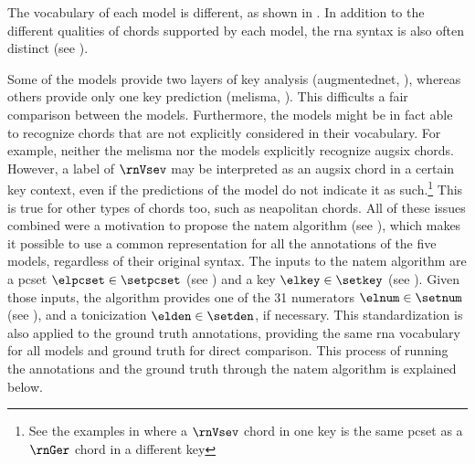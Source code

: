 
The vocabulary of each model is different, as shown in
. In addition to the different
qualities of chords supported by each model, the \gls{rna}
syntax is also often distinct (see
). 


Some of the models provide two layers of key analysis
(\gls{augmentednet}, \cite{micchi2021deep, chen2021attend}),
whereas others provide only one key prediction
(\gls{melisma}, \cite{mcleod2021modular}). This difficults a
fair comparison between the models. Furthermore, the models
might be in fact able to recognize chords that are not
explicitly considered in their vocabulary. For example,
neither the \gls{melisma} nor the
\textcite{mcleod2021modular} models explicitly recognize
\gls{augsix} chords. However, a label of $\rnVsev$ may be
interpreted as an \gls{augsix} chord in a certain key
context, even if the predictions of the model do not
indicate it as such.\footnote{See the examples in
 where a
$\rnVsev$ chord in one key is the same \gls{pcset} as a
$\rnGer$ chord in a different key} This is true for other
types of chords too, such as \gls{neapolitan} chords. All of
these issues combined were a motivation to propose the
\gls{natem} algorithm (see
), which
makes it possible to use a common representation for all the
annotations of the five models, regardless of their original
syntax. The inputs to the \gls{natem} algorithm are a
\gls{pcset} $\elpcset \in \setpcset$ (see
) and a key $\elkey
\in \setkey$ (see ).
Given those inputs, the algorithm provides one of the 31
numerators $\elnum \in \setnum$ (see
), and a
tonicization $\elden \in \setden$, if necessary. This
standardization is also applied to the ground truth
annotations, providing the same \gls{rna} vocabulary for all
models and ground truth for direct comparison. This process
of running the annotations and the ground truth through the
\gls{natem} algorithm is explained below.

